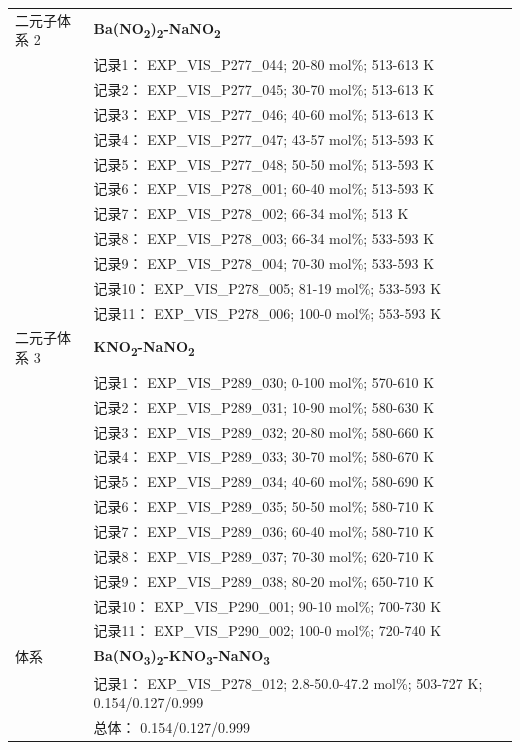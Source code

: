 \documentclass[12pt]{article}
\begin{document}
{\begin{longtable}[]{@{}
  >{\raggedright\arraybackslash}p{}
  >{\raggedright\arraybackslash}p{}@{}}
二元子体系 2  & \textbf{Ba(NO\textsubscript{2})\textsubscript{2}-NaNO\textsubscript{2}} \\
 & 记录1： EXP\_VIS\_P277\_044; 20-80 mol\%; 513-613 K \\
 & 记录2： EXP\_VIS\_P277\_045; 30-70 mol\%; 513-613 K \\
 & 记录3： EXP\_VIS\_P277\_046; 40-60 mol\%; 513-613 K \\
 & 记录4： EXP\_VIS\_P277\_047; 43-57 mol\%; 513-593 K \\
 & 记录5： EXP\_VIS\_P277\_048; 50-50 mol\%; 513-593 K \\
 & 记录6： EXP\_VIS\_P278\_001; 60-40 mol\%; 513-593 K \\
 & 记录7： EXP\_VIS\_P278\_002; 66-34 mol\%; 513 K \\
 & 记录8： EXP\_VIS\_P278\_003; 66-34 mol\%; 533-593 K \\
 & 记录9： EXP\_VIS\_P278\_004; 70-30 mol\%; 533-593 K \\
 & 记录10： EXP\_VIS\_P278\_005; 81-19 mol\%; 533-593 K \\
 & 记录11： EXP\_VIS\_P278\_006; 100-0 mol\%; 553-593 K  \\

二元子体系 3  & \textbf{KNO\textsubscript{2}-NaNO\textsubscript{2}} \\
 & 记录1： EXP\_VIS\_P289\_030; 0-100 mol\%; 570-610 K \\
 & 记录2： EXP\_VIS\_P289\_031; 10-90 mol\%; 580-630 K \\
 & 记录3： EXP\_VIS\_P289\_032; 20-80 mol\%; 580-660 K \\
 & 记录4： EXP\_VIS\_P289\_033; 30-70 mol\%; 580-670 K \\
 & 记录5： EXP\_VIS\_P289\_034; 40-60 mol\%; 580-690 K \\
 & 记录6： EXP\_VIS\_P289\_035; 50-50 mol\%; 580-710 K \\
 & 记录7： EXP\_VIS\_P289\_036; 60-40 mol\%; 580-710 K \\
 & 记录8： EXP\_VIS\_P289\_037; 70-30 mol\%; 620-710 K \\
 & 记录9： EXP\_VIS\_P289\_038; 80-20 mol\%; 650-710 K \\
 & 记录10： EXP\_VIS\_P290\_001; 90-10 mol\%; 700-730 K \\
 & 记录11： EXP\_VIS\_P290\_002; 100-0 mol\%; 720-740 K  \\

\midrule
体系 & \textbf{Ba(NO\textsubscript{3})\textsubscript{2}-KNO\textsubscript{3}-NaNO\textsubscript{3}} \\
 & 记录1： EXP\_VIS\_P278\_012; 2.8-50.0-47.2 mol\%; 503-727 K; 0.154/0.127/0.999 \\
 & 总体： 0.154/0.127/0.999  \\


\end{longtable}}
\end{document}
